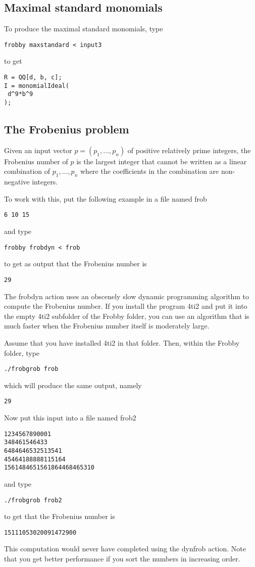 \documentclass{amsart}
\theoremstyle{definition}
\begin{document}
\subsection{Maximal standard monomials}

To produce the maximal standard monomials, type
\begin{verbatim}
frobby maxstandard < input3
\end{verbatim}
to get
\begin{verbatim}
R = QQ[d, b, c];
I = monomialIdeal(
 d^9*b^9
);
\end{verbatim}

\subsection{The Frobenius problem}

Given an input vector $p=(p_1,\ldots,p_n)$ of positive relatively
prime integers, the Frobenius number of $p$ is the largest integer
that cannot be written as a linear combination of $p_1,\ldots,p_n$
where the coefficients in the combination are non-negative integers.

To work with this, put the following example in a file named frob
\begin{verbatim}
6 10 15
\end{verbatim}
and type
\begin{verbatim}
frobby frobdyn < frob
\end{verbatim}
to get as output that the Frobenius number is
\begin{verbatim}
29
\end{verbatim}
The frobdyn action uses an obscenely slow dynamic programming
algorithm to compute the Frobenius number. If you install the program
4ti2 and put it into the empty 4ti2 subfolder of the Frobby folder,
you can use an algorithm that is much faster when the Frobenius number
itself is moderately large.

Assume that you have installed 4ti2 in that folder. Then, within the
Frobby folder, type
\begin{verbatim}
./frobgrob frob
\end{verbatim}
which will produce the same output, namely
\begin{verbatim}
29
\end{verbatim}
Now put this input into a file named frob2
\begin{verbatim}
1234567890001
348461546433
6484646532513541
45464188888115164
1561484651561864468465310
\end{verbatim}
and type
\begin{verbatim}
./frobgrob frob2
\end{verbatim}
to get that the Frobenius number is
\begin{verbatim}
15111053020091472900
\end{verbatim}
This computation would never have completed using the dynfrob
action. Note that you get better performance if you sort the numbers
in increasing order.
\end{document}
